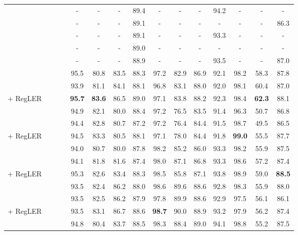 \documentclass[11pt]{article}
\newcommand{\cmark}{\ding{51}}\newcommand{\xmark}{\ding{55}}\newcommand{\cross}{\ding{61}}\newcommand{\mb}[1]{\textcolor{red}{#1}}
\begin{document}
\begin{table*}[t]
\begin{adjustbox}{width=\textwidth}
\begin{tabular}{ l c c c c c c c | c c c c | c c c }
 \cross & \xmark & \xmark & \xmark & - & - & - & 89.4 & - & - & - & 94.2 & - & - & - \\
 \cross & \xmark & \xmark & \xmark & - & - & - & 89.1 & - & - & - & - & - & - & 86.3  \\
 \cross & \xmark & \xmark & \xmark & - & - & - & 89.1 & - & - & - & 93.3 & - & - & -  \\
 \cross & \xmark & \xmark & \xmark & - & - & - & 89.0 & - & - & - & - & - & - & -  \\
 \cross & \xmark & \xmark & \xmark & - & - & - & 88.9 & - & - & - & 93.5 & - & - & 87.0 \\
\midrule
  & \xmark & \xmark & \xmark & 95.5 & 80.8 & 83.5 & 88.3 &  97.2 & 82.9 & 86.9 & 92.1 & 98.2 & 58.3 & 87.8 \\
 & \xmark & \xmark & \xmark & 93.9 & 81.1 & 84.1 & 88.1 & 96.8 & 83.1 & 88.0 & 92.0 & 98.1 & 60.4 & 87.0 \\ 
 + RegLER & \cmark & \cmark & \cmark & \textbf{95.7} & \textbf{83.6} & 86.5 & 89.0 & 97.1 & 83.8 & 88.2 & 92.3 & 98.4 & \textbf{62.3} & 88.1 \\ \midrule
 & \xmark & \xmark & \xmark & 94.9 & 82.1 & 80.0 & 88.4 & 97.2 & 76.5 & 83.5 & 91.4 & 96.3 & 50.7 & 86.8 \\
 & \xmark & \xmark & \xmark & 94.4 & 82.8 & 80.7 & 87.2 & 97.2 & 76.4 & 84.4 & 91.5 & 98.7 & 49.5 & 86.5 \\
 + RegLER & \cmark & \cmark & \cmark & 94.5 & 83.3 & 80.5 & 88.1 & 97.1 & 78.0 & 84.4 & 91.8 & \textbf{99.0} & 55.5 & 87.7 \\ \midrule
 & \xmark & \xmark & \xmark & 94.0 & 80.7 & 80.0 & 87.8 & 98.2 & 85.2 & 86.0 & 93.3 & 98.2 & 55.9 & 87.5 \\
 & \xmark & \xmark & \xmark & 94.1 & 81.8 & 81.6 & 87.4 & 98.0 & 87.1 & 86.8 & 93.3 & 98.6 & 57.2 & 87.4 \\
 + RegLER & \cmark & \cmark & \cmark& 95.3 & 82.6 & 83.4 & 88.3 & 98.5 & 85.8 & 87.1 & 93.8 & 98.9 & 59.0 & \textbf{88.5} \\ \midrule
 & \xmark & \xmark & \xmark & 93.5 & 82.4 & 86.2 & 88.0 & 98.6 & 89.6 & 88.6 & 92.8 & 98.3 & 55.9 & 88.0 \\
 & \xmark & \xmark & \xmark & 93.5 & 82.5 & 86.2 & 87.9 & 97.8 & 89.9 & 88.6 & 92.9 & 97.5 & 56.1 & 86.1 \\
 + RegLER & \cmark & \cmark & \cmark & 93.5 & 83.1 & 86.7 &  88.6 & \textbf{98.7} & 90.0 & 88.9 & 93.2 & 97.9 & 56.2 & 87.4 \\
\midrule
 & \xmark & \xmark & \xmark & 94.8 & 80.4 & 83.7 & 88.5 & 98.3 & 88.4 & 89.0 & 94.1 & 98.8 & 55.2 & 87.5 \\

\end{tabular}
\end{adjustbox}
\end{table*}
\end{document}
